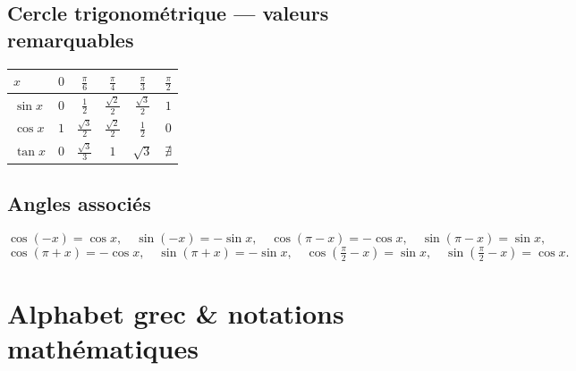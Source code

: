 \subsection{Cercle trigonométrique — valeurs remarquables}
\begin{center}\small
\begin{tabular}{@{}l*5{c}@{}}
\toprule
$x$ & $0$ & $\frac\pi6$ & $\frac\pi4$ & $\frac\pi3$ & $\frac\pi2$\\
\midrule
$\sin x$ & $0$ & $\frac12$ & $\frac{\sqrt2}2$ & $\frac{\sqrt3}2$ & $1$\\
$\cos x$ & $1$ & $\frac{\sqrt3}2$ & $\frac{\sqrt2}2$ & $\frac12$ & $0$\\
$\tan x$ & $0$ & $\frac{\sqrt3}3$ & $1$ & $\sqrt3$ & $\nexists$\\
\bottomrule
\end{tabular}
\end{center}

\subsection{Angles associés}
\[
\cos(-x)=\cos x,\quad \sin(-x)=-\sin x,\quad \cos(\pi-x)=-\cos x,\quad \sin(\pi-x)=\sin x,
\]
\[
\cos(\pi+x)=-\cos x,\quad \sin(\pi+x)=-\sin x,\quad \cos\!\left(\tfrac\pi2-x\right)=\sin x,\quad \sin\!\left(\tfrac\pi2-x\right)=\cos x.
\]

\section{Alphabet grec \& notations mathématiques}

